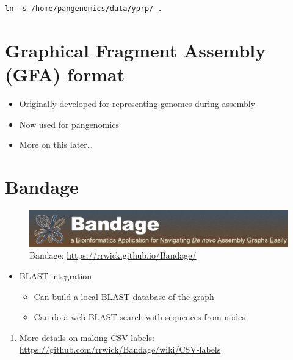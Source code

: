 \documentclass[
]{book}
\providecommand{\tightlist}{%
  \setlength{\itemsep}{0pt}\setlength{\parskip}{0pt}}
\begin{document}
\begin{verbatim}
ln -s /home/pangenomics/data/yprp/ .
\end{verbatim}

\hypertarget{graphical-fragment-assembly-gfa-format}{%
\section{Graphical Fragment Assembly (GFA) format}\label{graphical-fragment-assembly-gfa-format}}

\begin{itemize}
\tightlist
\item
  Originally developed for representing genomes during assembly
\item
  Now used for pangenomics
\item
  More on this later\ldots{}
\end{itemize}

\hypertarget{bandage}{%
\section{Bandage}\label{bandage}}

\begin{figure}
\centering
\includegraphics[width=1\textwidth,height=\textheight]{./Figures/Bandage.png}
\caption{Bandage: \url{https://rrwick.github.io/Bandage/}}
\end{figure}

\begin{itemize}
\tightlist
\item
  BLAST integration

  \begin{itemize}
  \tightlist
  \item
    Can build a local BLAST database of the graph
  \item
    Can do a web BLAST search with sequences from nodes
  \end{itemize}
\end{itemize}

\begin{enumerate}
\def\labelenumi{\arabic{enumi}.}
\setcounter{enumi}{1}
\tightlist
\item
  More details on making CSV labels: \url{https://github.com/rrwick/Bandage/wiki/CSV-labels}
\end{enumerate}
\end{document}
